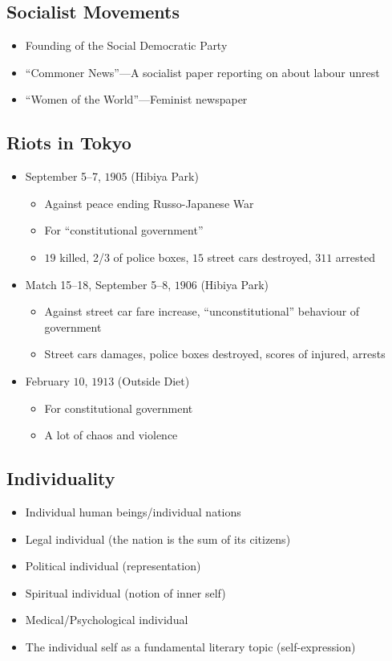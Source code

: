 \documentclass[class=article, crop=false]{standalone}
\begin{document}
  \subsection{Socialist Movements}
  \begin{itemize}
    \item Founding of the Social Democratic Party
    \item ``Commoner News''---A socialist paper reporting on about labour unrest
    \item ``Women of the World''---Feminist newspaper
  \end{itemize}
  \subsection{Riots in Tokyo}
  \begin{itemize}
    \item September 5--7, $1905$ (Hibiya Park)
    \begin{itemize}
      \item Against peace ending Russo-Japanese War
      \item For ``constitutional government''
      \item $19$ killed, 2/3 of police boxes, $15$ street cars destroyed, $311$ arrested
    \end{itemize}
    \item Match 15--18, September 5--8, $1906$ (Hibiya Park) 
    \begin{itemize}
      \item Against street car fare increase, ``unconstitutional'' behaviour of government
      \item Street cars damages, police boxes destroyed, scores of injured, arrests
    \end{itemize}
    \item February $10$, $1913$ (Outside Diet)
    \begin{itemize}
      \item For constitutional government
      \item A lot of chaos and violence
    \end{itemize}
  \end{itemize}
  \subsection{Individuality}
  \begin{itemize}
    \item Individual human beings/individual nations
    \item Legal individual (the nation is the sum of its citizens)
    \item Political individual (representation)
    \item Spiritual individual (notion of inner self)
    \item Medical/Psychological individual
    \item The individual self as a fundamental literary topic (self-expression)
  \end{itemize}
\end{document}
